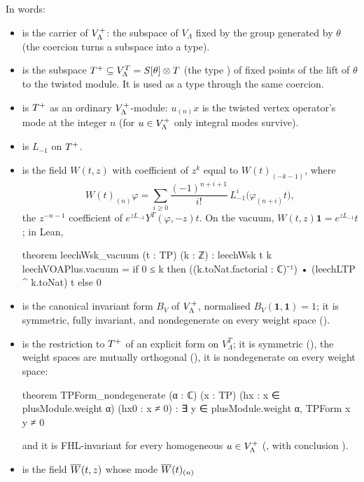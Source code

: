 In words:
\begin{itemize}
\item {} is the carrier of $V_{\Lambda}^{+}$: the subspace of $V_\Lambda$ fixed by the group
  generated by $\theta$ (the coercion  turns a subspace into a type).
\item {} is the subspace $T^{+}\subseteq V_\Lambda^T=S[\theta]\otimes T$ (the type
  ) of fixed points of the lift of $\theta$ to the twisted module.  It is used as a type
  through the same coercion.
\item {} is $T^{+}$ as an ordinary $V_{\Lambda}^{+}$-module: $u_{(n)}x$ is the twisted
  vertex operator's mode at the integer $n$ (for $u\in V_{\Lambda}^{+}$ only integral modes survive).
\item {} is $L_{-1}$ on $T^{+}$.
\item {} is the field $W(t,z)$ with coefficient of $z^k$ equal to
  $W(t)_{(-k-1)}$, where
  \begin{equation}\label{ch10:eq:Wmode}
    W(t)_{(n)}\varphi=\sum_{i\ge0}\frac{(-1)^{n+i+1}}{i!}\,L_{-1}^i\bigl(\varphi_{(n+i)}t\bigr),
  \end{equation}
  the $z^{-n-1}$ coefficient of $e^{zL_{-1}}Y^T(\varphi,-z)t$.  On the vacuum,
  $W(t,z)\mathbf 1=e^{zL_{-1}}t$; in Lean,
\begin{leancode}
theorem leechWsk_vacuum (t : TP) (k : ℤ) :
    leechWsk t k leechVOAPlus.vacuum
      = if 0 ≤ k then ((k.toNat.factorial : ℂ)⁻¹) • (leechLTP ^ k.toNat) t else 0
\end{leancode}
\item {} is the canonical invariant form $B_V$ of $V_{\Lambda}^{+}$, normalised
  $B_V(\mathbf1,\mathbf1)=1$; it is symmetric, fully invariant, and nondegenerate on every weight
  space ().
\item {} is the restriction to $T^{+}$ of an explicit form on $V^T_\Lambda$; it is
  symmetric (), the weight spaces are mutually orthogonal
  (), it is nondegenerate on every weight space:
\begin{leancode}
theorem TPForm_nondegenerate (α : ℂ) (x : TP) (hx : x ∈ plusModule.weight α) (hx0 : x ≠ 0) :
    ∃ y ∈ plusModule.weight α, TPForm x y ≠ 0
\end{leancode}
  and it is FHL-invariant for every homogeneous $u\in V_{\Lambda}^{+}$ (, with
  conclusion ).
\item {} is the field $\overline{W}(t,z)$ whose mode $\overline{W}(t)_{(n)}$

\end{itemize}
